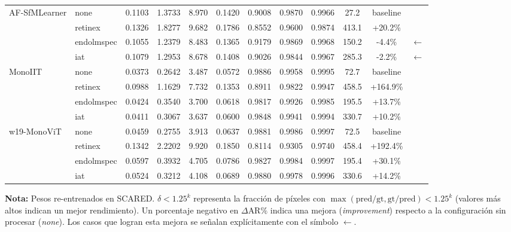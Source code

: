 \documentclass{article}
\begin{document}
\begin{table}[htbp]
\begin{tabular}{llccccccccc@{\hspace{12pt}}l}
AF-SfMLearner & none       & 0.1103 & 1.3733 & 8.970 & 0.1420 & 0.9008 & 0.9870 & 0.9966 &  27.2 & baseline  & \\
              & retinex    & 0.1326 & 1.8277 & 9.682 & 0.1786 & 0.8552 & 0.9600 & 0.9874 & 413.1 & +20.2\%   & \\
              & endolmspec & 0.1055 & 1.2379 & 8.483 & 0.1365 & 0.9179 & 0.9869 & 0.9968 & 150.2 &  -4.4\%   & $\leftarrow$ \\
              & iat        & 0.1079 & 1.2953 & 8.678 & 0.1408 & 0.9026 & 0.9844 & 0.9967 & 285.3 &  -2.2\%   & $\leftarrow$ \\
\addlinespace[0.8em]

MonoIIT & none       & 0.0373 & 0.2642 & 3.487 & 0.0572 & 0.9886 & 0.9958 & 0.9995 &  72.7 & baseline  & \\
        & retinex    & 0.0988 & 1.1629 & 7.732 & 0.1353 & 0.8911 & 0.9822 & 0.9947 & 458.5 & +164.9\%  & \\
        & endolmspec & 0.0424 & 0.3540 & 3.700 & 0.0618 & 0.9817 & 0.9926 & 0.9985 & 195.5 & +13.7\%   & \\
        & iat        & 0.0411 & 0.3067 & 3.637 & 0.0600 & 0.9848 & 0.9941 & 0.9994 & 330.7 & +10.2\%   & \\
\addlinespace[0.8em]

w19-MonoViT & none       & 0.0459 & 0.2755 & 3.913 & 0.0637 & 0.9881 & 0.9986 & 0.9997 &  72.5 & baseline  & \\
            & retinex    & 0.1342 & 2.2202 & 9.920 & 0.1850 & 0.8114 & 0.9305 & 0.9740 & 458.4 & +192.4\%  & \\
            & endolmspec & 0.0597 & 0.3932 & 4.705 & 0.0786 & 0.9827 & 0.9984 & 0.9997 & 195.4 & +30.1\%   & \\
            & iat        & 0.0524 & 0.3212 & 4.108 & 0.0689 & 0.9880 & 0.9978 & 0.9996 & 330.6 & +14.2\%   & \\
\bottomrule
\end{tabular}

\vspace{0.6em}
\begin{minipage}{\linewidth}
    \footnotesize
    \textbf{Nota:} Pesos re-entrenados en SCARED. $\delta < 1.25^k$ representa la fracción de píxeles con $\max(\text{pred}/\text{gt}, \text{gt}/\text{pred}) < 1.25^k$ (valores más altos indican un mejor rendimiento).
    Un porcentaje negativo en $\Delta\text{AR}\%$ indica una mejora (\textit{improvement}) respecto a la configuración sin procesar (\textit{none}). Los casos que logran esta mejora se señalan explícitamente con el símbolo $\leftarrow$.
\end{minipage}

\end{table}
\end{document}
